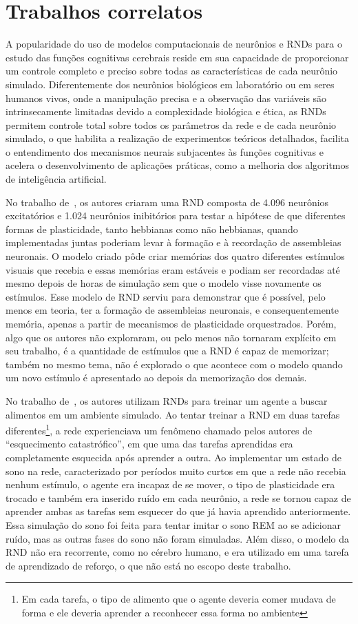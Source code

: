 \section{Trabalhos correlatos}

A popularidade do uso de modelos computacionais de neurônios e RNDs para o estudo das funções cognitivas cerebrais reside em sua
capacidade de proporcionar um controle completo e preciso sobre todas as características de cada neurônio simulado. Diferentemente
dos neurônios biológicos em laboratório ou em seres humanos vivos, onde a manipulação precisa e a observação das variáveis são
intrinsecamente limitadas devido a complexidade biológica e ética, as RNDs permitem controle total sobre todos os parâmetros da
rede e de cada neurônio simulado, o que habilita a realização de experimentos teóricos detalhados, facilita o entendimento dos
mecanismos neurais subjacentes às funções cognitivas e acelera o desenvolvimento de aplicações práticas, como a melhoria dos
algoritmos de inteligência artificial. 

No trabalho de~, os autores criaram uma RND composta de 4.096 neurônios excitatórios e 1.024
neurônios inibitórios para testar a hipótese de que diferentes formas de plasticidade, tanto hebbianas como não hebbianas, quando
implementadas juntas poderiam levar à formação e à recordação de assembleias neuronais. O modelo criado pôde criar memórias dos
quatro diferentes estímulos visuais que recebia e essas memórias eram estáveis e podiam ser recordadas até mesmo depois de horas
de simulação sem que o modelo visse novamente os estímulos. Esse modelo de RND serviu para demonstrar que é possível, pelo menos
em teoria, ter a formação de assembleias neuronais, e consequentemente memória, apenas a partir de mecanismos de plasticidade
orquestrados. Porém, algo que os autores não exploraram, ou pelo menos não tornaram explícito em seu trabalho, é a quantidade de
estímulos que a RND é capaz de memorizar; também no mesmo tema, não é explorado o que acontece com o modelo quando um novo
estímulo é apresentado ao depois da memorização dos demais.

No trabalho de~, os autores utilizam RNDs para treinar um agente a buscar alimentos em um ambiente
simulado. Ao tentar treinar a RND em duas tarefas diferentes\footnote{Em cada tarefa, o tipo de alimento que o agente deveria
comer mudava de forma e ele deveria aprender a reconhecer essa forma no ambiente}, a rede experienciava um fenômeno chamado pelos
autores de ``esquecimento catastrófico'', em que uma das tarefas aprendidas era completamente esquecida após aprender a outra. Ao
implementar um estado de sono na rede, caracterizado por períodos muito curtos em que a rede não recebia nenhum estímulo, o agente
era incapaz de se mover, o tipo de plasticidade era trocado e também era inserido ruído em cada neurônio, a rede se tornou capaz
de aprender ambas as tarefas sem esquecer do que já havia aprendido anteriormente. Essa simulação do sono foi feita para tentar
imitar o sono REM ao se adicionar ruído, mas as outras fases do sono não foram simuladas. Além disso, o modelo da RND não era
recorrente, como no cérebro humano, e era utilizado em uma tarefa de aprendizado de reforço, o que não está no escopo deste
trabalho.

